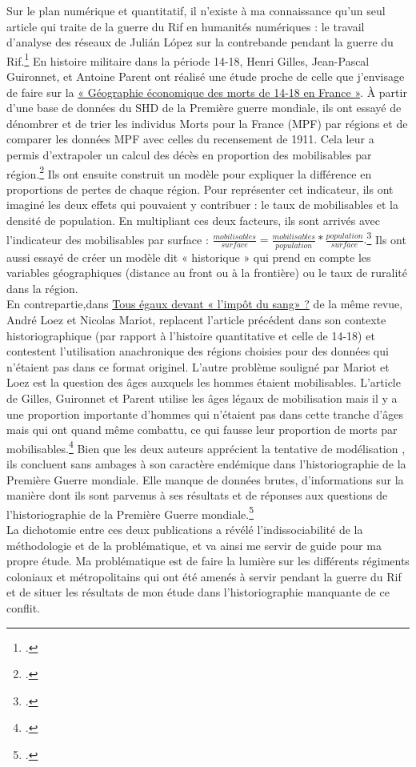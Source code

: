 Sur le plan numérique et quantitatif, il n’existe à ma connaissance qu’un seul article qui traite de la guerre du Rif en humanités numériques : le travail d’analyse des réseaux de Julián López sur la contrebande pendant la guerre du Rif.\footcites{lopez2016} En histoire militaire dans la période 14-18, Henri Gilles, Jean-Pascal Guironnet, et Antoine Parent ont réalisé une étude proche  de celle que j’envisage de faire sur la \underline{« Géographie économique des morts de 14-18 en France »}.  À partir d'une base de données du SHD de la Première guerre mondiale, ils ont essayé de dénombrer et de trier les individus Morts pour la France (MPF) par régions et de comparer les données MPF avec celles du recensement de 1911. Cela leur a permis d'extrapoler un calcul des décès en proportion des mobilisables par région.\footcites[521]{gilles2014} Ils ont ensuite construit un modèle pour expliquer  la différence en proportions de pertes de chaque région. Pour représenter cet indicateur, ils ont imaginé les deux effets qui pouvaient y contribuer : le taux de mobilisables et la densité de population. En multipliant ces deux facteurs, ils sont arrivés avec l’indicateur des mobilisables par surface :
$
\frac{mobilisables}{surface} = 
\frac{mobilisables}{population}* 
\frac{population}{surface}. 
$\footcites[523]{gilles2014}
Ils ont aussi essayé de créer un modèle dit « historique » qui prend en compte les variables géographiques (distance au front ou à la frontière) ou le taux de ruralité dans la région.\\


En contrepartie,dans \underline{Tous égaux devant « l’impôt du sang» ?} de la même revue, André Loez et Nicolas Mariot, replacent l’article précédent dans son contexte historiographique (par rapport à l’histoire quantitative et celle de 14-18) et contestent l’utilisation anachronique des régions choisies pour des données qui n’étaient pas dans ce format originel. L’autre problème souligné par Mariot et Loez est la question des âges auxquels les hommes étaient mobilisables. L’article de Gilles, Guironnet et Parent utilise les âges légaux de mobilisation mais il y a une proportion importante d’hommes qui n'étaient pas dans cette tranche d'âges mais qui ont quand même combattu, ce qui fausse leur proportion de morts par mobilisables.\footcites[538]{mariot2014} Bien que les deux auteurs apprécient la tentative de modélisation , ils concluent sans ambages à son caractère endémique dans l'historiographie de la Première Guerre mondiale. Elle  manque de données brutes, d’informations sur la manière dont ils sont parvenus à  ses résultats et de réponses aux questions de l'historiographie de la Première Guerre mondiale.\footcites[541]{mariot2014}\\


La dichotomie entre ces deux publications a révélé l'indissociabilité de la méthodologie et de la problématique, et va ainsi me servir de guide pour ma propre étude.  Ma problématique est de faire la lumière sur les différents régiments coloniaux et métropolitains qui ont été amenés à servir pendant la guerre du Rif et de situer les résultats de mon étude dans l’historiographie manquante de ce conflit. 






